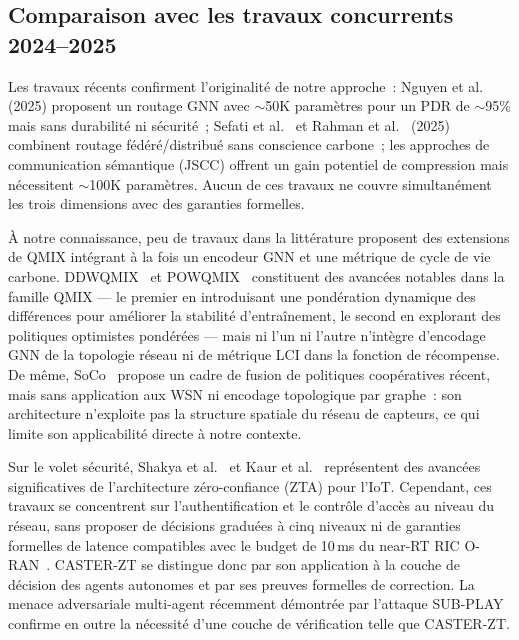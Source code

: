 \subsection{Comparaison avec les travaux concurrents 2024--2025}

Les travaux récents confirment l'originalité de notre approche~: Nguyen et al.\ \cite{Nguyen2025GNNIoT} (2025) proposent un routage GNN avec $\sim$50K paramètres pour un PDR de $\sim$95\% mais sans durabilité ni sécurité~; Sefati et al.\ \cite{sefati_federated_2025} et Rahman et al.\ \cite{rahman_distributed_2025} (2025) combinent routage fédéré/distribué sans conscience carbone~; les approches de communication sémantique (JSCC) offrent un gain potentiel de compression mais nécessitent $\sim$100K paramètres. Aucun de ces travaux ne couvre simultanément les trois dimensions avec des garanties formelles.

À notre connaissance, peu de travaux dans la littérature proposent des extensions de QMIX intégrant à la fois un encodeur GNN et une métrique de cycle de vie carbone. DDWQMIX~\cite{ddwqmix_cac2024} et POWQMIX~\cite{powqmix_arxiv2025} constituent des avancées notables dans la famille QMIX --- le premier en introduisant une pondération dynamique des différences pour améliorer la stabilité d'entraînement, le second en explorant des politiques optimistes pondérées --- mais ni l'un ni l'autre n'intègre d'encodage GNN de la topologie réseau ni de métrique LCI dans la fonction de récompense. De même, SoCo~\cite{soco_arxiv2025} propose un cadre de fusion de politiques coopératives récent, mais sans application aux WSN ni encodage topologique par graphe~: son architecture n'exploite pas la structure spatiale du réseau de capteurs, ce qui limite son applicabilité directe à notre contexte.

Sur le volet sécurité, Shakya et al.~\cite{shakya_zt_iot2025} et Kaur et al.~\cite{kaur_zta_iot2024} représentent des avancées significatives de l'architecture zéro-confiance (ZTA) pour l'IoT. Cependant, ces travaux se concentrent sur l'authentification et le contrôle d'accès au niveau du réseau, sans proposer de décisions graduées à cinq niveaux ni de garanties formelles de latence compatibles avec le budget de 10\,ms du near-RT RIC O-RAN~\cite{polese2023oran}. CASTER-ZT se distingue donc par son application à la couche de décision des agents autonomes et par ses preuves formelles de correction. La menace adversariale multi-agent récemment démontrée par l'attaque SUB-PLAY \cite{subplay_marl2025} confirme en outre la nécessité d'une couche de vérification telle que CASTER-ZT.


